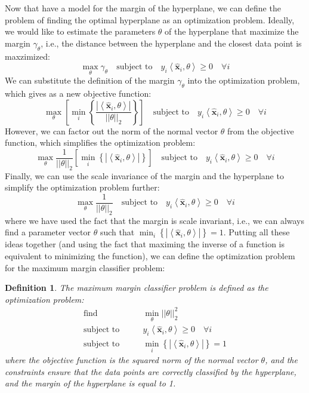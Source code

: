 \documentclass{article}[11pt]
\newtheorem{defn}{Definition}
\newcommand{\norm}[1]{\left|\left|#1\right|\right|}
\begin{document}
Now that have a model for the margin of the hyperplane, we can define the problem of finding the optimal hyperplane as an optimization problem.
Ideally, we would like to estimate the parameters $\theta$ of the hyperplane that maximize the margin $\gamma_{\theta}$, i.e., the distance between the hyperplane and the closest data point is maxzimized:
\begin{equation*}\label{eq:max-margin}
    \max_{\theta}\gamma_{\theta}\quad\text{subject to}\quad y_{i}\left<\hat{\mathbf{x}}_{i},\theta\right> \geq 0\quad\forall i
\end{equation*}
We can substitute the definition of the margin $\gamma_{\theta}$ into the optimization problem, which gives as a new objective function:
\begin{equation*}
    \max_{\theta}\left[\min_{i}\left\{\frac{|\left<\hat{\mathbf{x}}_{i},\theta\right>|}{\norm{\theta}_{2}}\right\}\right]\quad\text{subject to}\quad y_{i}\left<\hat{\mathbf{x}}_{i},\theta\right> \geq 0\quad\forall i
\end{equation*}
However, we can factor out the norm of the normal vector $\theta$ from the objective function, which simplifies the optimization problem:
\begin{equation*}
    \max_{\theta}\frac{1}{\norm{\theta}_{2}}\left[\min_{i}\left\{|\left<\hat{\mathbf{x}}_{i},\theta\right>|\right\}\right]\quad\text{subject to}\quad y_{i}\left<\hat{\mathbf{x}}_{i},\theta\right> \geq 0\quad\forall i
\end{equation*}
Finally, we can use the scale invariance of the margin and the hyperplane to simplify the optimization problem further:
\begin{equation*}
    \max_{\theta}\frac{1}{\norm{\theta}_{2}}\quad\text{subject to}\quad y_{i}\left<\hat{\mathbf{x}}_{i},\theta\right> \geq 0\quad\forall i
\end{equation*}
where we have used the fact that the margin is scale invariant, i.e., we can always find a parameter vector $\theta$ such that
$\min_{i}\left\{|\left<\hat{\mathbf{x}}_{i},\theta\right>|\right\} = 1$.
Putting all these ideas together (and using the fact that maximing the inverse of a function is equivalent to minimizing the function), we can define the optimization problem for the maximum margin classifier problem:
\begin{defn}\label{defn:max-margin}
    The maximum margin classifier problem is defined as the optimization problem:
    \begin{align*}
    \text{find}\qquad & \min_{\theta}\norm{\theta}_{2}^{2}\\
    \text{subject to}\qquad & y_{i}\left<\hat{\mathbf{x}}_{i},\theta\right> \geq 0\quad\forall i\\
    \text{subject to}\qquad & \min_{i}\left\{|\left<\hat{\mathbf{x}}_{i},\theta\right>|\right\} = 1
    \end{align*}
where the objective function is the squared norm of the normal vector $\theta$, and the constraints ensure that the data points are correctly classified by the hyperplane, 
and the margin of the hyperplane is equal to 1.
\end{defn}
\end{document}
